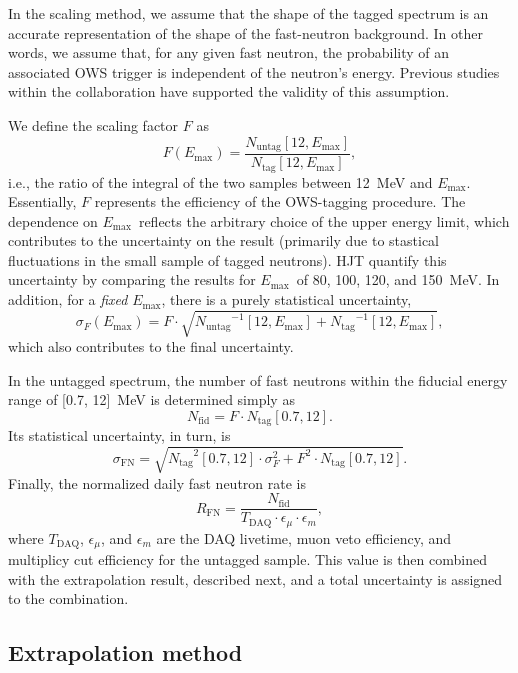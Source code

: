 \documentclass[../thesis.tex]{subfiles}
\begin{document}
In the scaling method, we assume that the shape of the tagged spectrum is an
accurate representation of the shape of the fast-neutron background. In other
words, we assume that, for any given fast neutron, the probability of an
associated OWS trigger is independent of the neutron's energy. Previous studies
within the collaboration have supported the validity of this assumption.

\def\emax{\ensuremath{E_\mathrm{max}}} \def\ntag{\ensuremath{N_\mathrm{tag}}}
\def\nuntag{\ensuremath{N_\mathrm{untag}}}

We define the scaling factor $F$ as \[ F(\emax) = \frac{\nuntag[12,
    \emax]}{\ntag[12, \emax]}, \] i.e., the ratio of the integral of the two
samples between 12~MeV and \emax. Essentially, $F$ represents the efficiency of
the OWS-tagging procedure. The dependence on \emax\ reflects the arbitrary
choice of the upper energy limit, which contributes to the uncertainty on the
result (primarily due to stastical fluctuations in the small sample of tagged
neutrons). HJT quantify this uncertainty by comparing the results for \emax\ of
80, 100, 120, and 150~MeV. In addition, for a \emph{fixed} \emax, there is a
purely statistical uncertainty,
\[ \sigma_F(\emax) = F \cdot \sqrt{\nuntag^{-1}[12, \emax] + \ntag^{-1}[12,
    \emax]},
\]
which also contributes to the final uncertainty.

\def\nfn{\ensuremath{N_\mathrm{fid}}} \def\rfn{\ensuremath{R_\mathrm{FN}}}

In the untagged spectrum, the number of fast neutrons within the fiducial energy
range of [0.7, 12]~MeV is determined simply as
\[ \nfn = F \cdot \ntag[0.7, 12]. \] Its statistical uncertainty, in turn, is
\begin{equation}
  \label{eq:fastn_scal_unc}
  \sigma_\mathrm{FN} = \sqrt{\ntag^2[0.7, 12]
    \cdot \sigma_F^2 + F^2 \cdot \ntag[0.7, 12]}.
\end{equation}
Finally, the normalized daily fast neutron rate is
\begin{equation}
  \label{eq:fastn_rate}
  \rfn = \frac{\nfn}{T_\mathrm{DAQ} \cdot \epsilon_\mu \cdot \epsilon_m},
\end{equation}
where $T_\mathrm{DAQ}$, $\epsilon_\mu$, and $\epsilon_m$ are the DAQ livetime,
muon veto efficiency, and multiplicy cut efficiency for the untagged
sample. This value is then combined with the extrapolation result, described
next, and a total uncertainty is assigned to the combination.

\subsection{Extrapolation method}
\label{sec:fastn_extrap}
\end{document}

